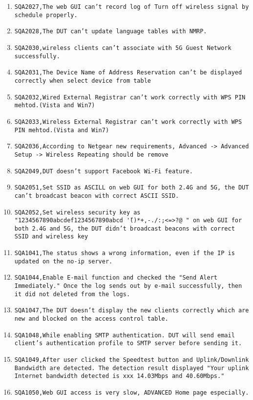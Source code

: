 \documentclass[12pt]{report}
\begin{document}
\begin{itemize}
\begin{enumerate}
		\item \texttt{SQA2027,The web GUI can't record log of Turn off wireless signal by schedule properly.}
		\item \texttt{SQA2028,The DUT can't update language tables with NMRP.}
		\item \texttt{SQA2030,wireless clients can't associate with 5G Guest Network successfully.}
		\item \texttt{SQA2031,The Device Name of Address Reservation can't be displayed correctly when select device from table}
		\item \texttt{SQA2032,Wired External Registrar can't work correctly with WPS PIN mehtod.(Vista and Win7)}
		\item \texttt{SQA2033,Wireless External Registrar can't work correctly with WPS PIN mehtod.(Vista and Win7)}
		\item \texttt{SQA2036,According to Netgear new requirements, Advanced -> Advanced Setup -> Wireless Repeating should be remove}
		\item \texttt{SQA2049,DUT doesn't support Facebook Wi-Fi feature.}
		\item \texttt{SQA2051,Set SSID as ASCILL on web GUI for both 2.4G and 5G, the DUT can't broadcast beacon with correct ASCII SSID.}
		\item \texttt{SQA2052,Set wireless security key as "1234567890abcdef1234567890abcd \!\"'()*+,-./:;<=>?@~" on web GUI for both 2.4G and 5G, the DUT didn't broadcast beacons with correct SSID and wireless key}
		\item \texttt{SQA1041,The status shows a wrong information, even if the IP is updated on the no-ip server.}
		\item \texttt{SQA1044,Enable E-mail function and checked the "Send Alert Immediately." Once the log sends out by e-mail successfully, then it did not deleted from the logs.}
		\item \texttt{SQA1047,The DUT doesn't display the new clients correctly which are new and blocked on the access control table.}
		\item \texttt{SQA1048,While enabling SMTP authentication. DUT will send email client's authentication profile to SMTP server before sending it.}
		\item \texttt{SQA1049,After user clicked the Speedtest button and Uplink/Downlink Bandwidth are detected. The detection result displayed "Your uplink Internet bandwidth detected is xxx 14.03Mbps and 40.60Mbps."}
		\item \texttt{SQA1050,Web GUI access is very slow, ADVANCED Home page especially.}

\end{enumerate}
\end{itemize}
\end{document}
